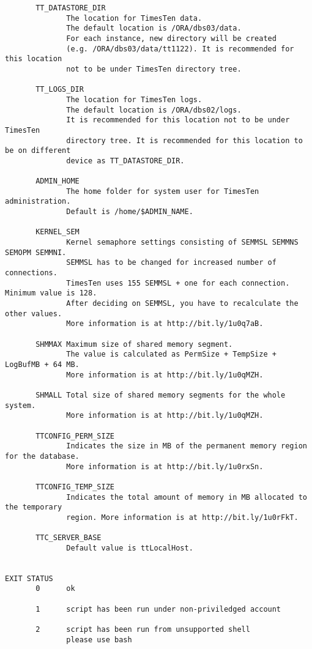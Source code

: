 \documentclass[11pt, letterpaper]{article}
\begin{document}
\begin{lstlisting}
       TT_DATASTORE_DIR
              The location for TimesTen data.
              The default location is /ORA/dbs03/data.
              For each instance, new directory will be created 
              (e.g. /ORA/dbs03/data/tt1122). It is recommended for this location
              not to be under TimesTen directory tree.

       TT_LOGS_DIR
              The location for TimesTen logs.
              The default location is /ORA/dbs02/logs.
              It is recommended for this location not to be under TimesTen 
              directory tree. It is recommended for this location to be on different 
              device as TT_DATASTORE_DIR.

       ADMIN_HOME
              The home folder for system user for TimesTen administration.
              Default is /home/$ADMIN_NAME.

       KERNEL_SEM
              Kernel semaphore settings consisting of SEMMSL SEMMNS SEMOPM SEMMNI.
              SEMMSL has to be changed for increased number of connections.
              TimesTen uses 155 SEMMSL + one for each connection. Minimum value is 128.
              After deciding on SEMMSL, you have to recalculate the other values.
              More information is at http://bit.ly/1u0q7aB.

       SHMMAX Maximum size of shared memory segment.
              The value is calculated as PermSize + TempSize + LogBufMB + 64 MB.
              More information is at http://bit.ly/1u0qMZH.

       SHMALL Total size of shared memory segments for the whole system.
              More information is at http://bit.ly/1u0qMZH.

       TTCONFIG_PERM_SIZE
              Indicates the size in MB of the permanent memory region for the database.
              More information is at http://bit.ly/1u0rxSn.

       TTCONFIG_TEMP_SIZE
              Indicates the total amount of memory in MB allocated to the temporary
              region. More information is at http://bit.ly/1u0rFkT.

       TTC_SERVER_BASE
              Default value is ttLocalHost.


EXIT STATUS
       0      ok

       1      script has been run under non-priviledged account

       2      script has been run from unsupported shell
              please use bash


\end{lstlisting}
\end{document}
